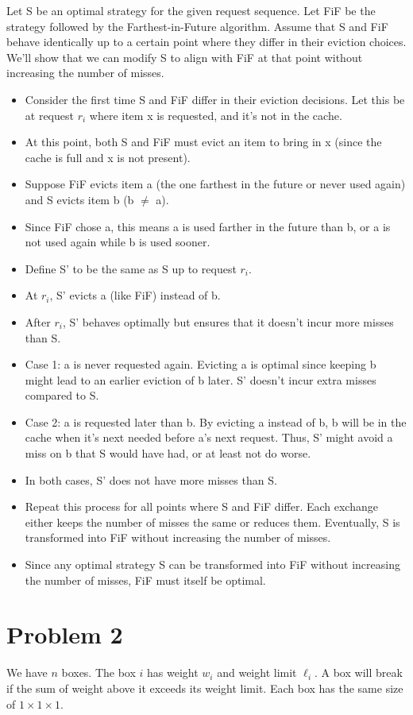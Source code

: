 Let S be an optimal strategy for the given request sequence. Let FiF be the strategy followed by the Farthest-in-Future algorithm. Assume that S and FiF behave identically up to a certain point where they differ in their eviction choices. We'll show that we can modify S to align with FiF at that point without increasing the number of misses. \begin{itemize} \item Consider the first time S and FiF differ in their eviction decisions. Let this be at request $r_i$ where item x is requested, and it's not in the cache. \item At this point, both S and FiF must evict an item to bring in x (since the cache is full and x is not present). \item Suppose FiF evicts item a (the one farthest in the future or never used again) and S evicts item b (b $\neq$ a). \item Since FiF chose a, this means a is used farther in the future than b, or a is not used again while b is used sooner. \item Define S' to be the same as S up to request $r_i$. \item At $r_i$, S' evicts a (like FiF) instead of b. \item After $r_i$, S' behaves optimally but ensures that it doesn't incur more misses than S. \item Case 1: a is never requested again. Evicting a is optimal since keeping b might lead to an earlier eviction of b later. S' doesn't incur extra misses compared to S. \item Case 2: a is requested later than b. By evicting a instead of b, b will be in the cache when it's next needed before a's next request. Thus, S' might avoid a miss on b that S would have had, or at least not do worse. \item In both cases, S' does not have more misses than S. \item Repeat this process for all points where S and FiF differ. Each exchange either keeps the number of misses the same or reduces them. Eventually, S is transformed into FiF without increasing the number of misses. \item Since any optimal strategy S can be transformed into FiF without increasing the number of misses, FiF must itself be optimal. \end{itemize}


\section*{Problem 2}
We have $n$ boxes. The box $i$ has weight $w_i$ and weight limit $\ell_i$. A box will break if the sum of weight above it exceeds its weight limit. Each box has the same size of $1 \times 1 \times 1$.

